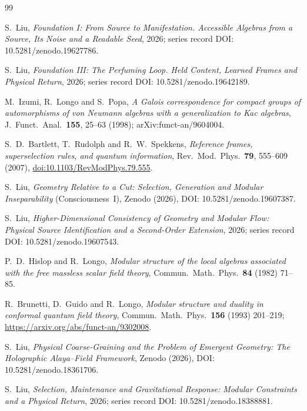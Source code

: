 \documentclass[12pt]{article}
\theoremstyle{definition}
\theoremstyle{remark}
\begin{document}
\newpage
{}

\begin{thebibliography}{99}
\raggedright
\sloppy

S.~Liu, \emph{Foundation I: From Source to Manifestation. Accessible Algebras from a Source, Its Noise and a Readable Seed}, 2026; series record DOI: 10.5281/zenodo.19627786.

S.~Liu, \emph{Foundation III: The Perfuming Loop. Held Content, Learned Frames and Physical Return}, 2026; series record DOI: 10.5281/zenodo.19642189.

M.~Izumi, R.~Longo and S.~Popa,
\emph{A Galois correspondence for compact groups of automorphisms of von Neumann algebras with a generalization to Kac algebras},
J.\ Funct.\ Anal.\ \textbf{155}, 25--63 (1998); arXiv:funct-an/9604004.

S.~D.~Bartlett, T.~Rudolph and R.~W.~Spekkens,
\emph{Reference frames, superselection rules, and quantum information},
Rev.\ Mod.\ Phys.\ \textbf{79}, 555--609 (2007),
\href{https://doi.org/10.1103/RevModPhys.79.555}{doi:10.1103/RevModPhys.79.555}.

S.~Liu, \emph{Geometry Relative to a Cut: Selection, Generation and Modular Inseparability} (Consciousness~I), Zenodo (2026), DOI: 10.5281/zenodo.19607387.

S.~Liu, \emph{Higher-Dimensional Consistency of Geometry and Modular Flow: Physical Source Identification and a Second-Order Extension}, 2026; series record DOI: 10.5281/zenodo.19607543.

P.~D.~Hislop and R.~Longo, \emph{Modular structure of the local
algebras associated with the free massless scalar field theory},
Commun.\ Math.\ Phys.\ \textbf{84} (1982) 71--85.

R.~Brunetti, D.~Guido and R.~Longo, \emph{Modular structure and
duality in conformal quantum field theory},
Commun.\ Math.\ Phys.\ \textbf{156} (1993) 201--219;
\url{https://arxiv.org/abs/funct-an/9302008}.

S.~Liu, \emph{Physical Coarse-Graining and the Problem of Emergent Geometry: The Holographic Alaya--Field Framework}, Zenodo (2026), DOI: 10.5281/zenodo.18361706.

S.~Liu, \emph{Selection, Maintenance and Gravitational Response: Modular Constraints and a Physical Return}, 2026; series record DOI: 10.5281/zenodo.18388881.


\end{thebibliography}
\end{document}
